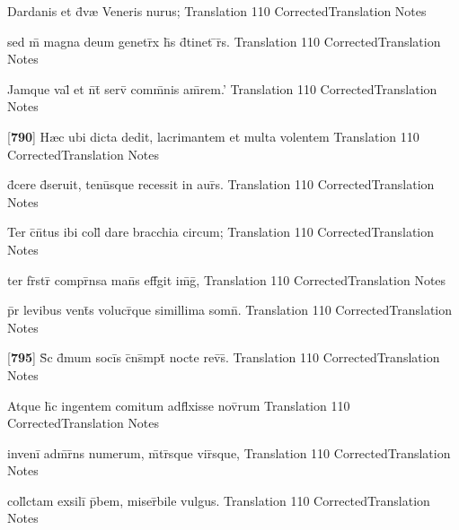 \latline
  {Dardanis et d\={\macron {\i}}v{\ae} Veneris nurus;}
  { Translation }
  {110}
  { CorrectedTranslation }
  { Notes }


\latline
  {sed m\={} magna deum genetr\={\macron {\i}}x h\={\macron {\i}}s d\={}tinet \={}r\={\macron {\i}}s.}
  { Translation }
  {110}
  { CorrectedTranslation }
  { Notes }


\latline
  {Jamque val\={} et n\={}t\={\macron {\i}} serv\={} comm\={}nis am\={}rem.'}
  { Translation }
  {110}
  { CorrectedTranslation }
  { Notes }


\latline
  {[\textbf{790}] H{\ae}c ubi dicta dedit, lacrimantem et multa volentem}
  { Translation }
  {110}
  { CorrectedTranslation }
  { Notes }


\latline
  {d\={\macron {\i}}cere d\={}seruit, tenu\={\macron {\i}}sque recessit in aur\={}s.}
  { Translation }
  {110}
  { CorrectedTranslation }
  { Notes }


\latline
  {Ter c\={}n\={}tus ibi coll\={} dare bracchia circum;}
  { Translation }
  {110}
  { CorrectedTranslation }
  { Notes }


\latline
  {ter fr\={}str\={} compr\={}nsa man\={}s eff\={}git im\={}g\={},}
  { Translation }
  {110}
  { CorrectedTranslation }
  { Notes }


\latline
  {p\={}r levibus vent\={\macron {\i}}s volucr\={\macron {\i}}que simillima somn\={}.}
  { Translation }
  {110}
  { CorrectedTranslation }
  { Notes }


\latline
  {[\textbf{795}] S\={\macron {\i}}c d\={}mum soci\={}s c\={}ns\={}mpt\={} nocte rev\={\macron {\i}}s\={}.}
  { Translation }
  {110}
  { CorrectedTranslation }
  { Notes }


\latline
  {Atque h\={\macron {\i}}c ingentem comitum adfl\={}xisse nov\={}rum}
  { Translation }
  {110}
  { CorrectedTranslation }
  { Notes }


\latline
  {inveni\={} adm\={\macron {\i}}r\={}ns numerum, m\={}tr\={}sque vir\={}sque,}
  { Translation }
  {110}
  { CorrectedTranslation }
  { Notes }


\latline
  {coll\={}ctam exsili\={} p\={}bem, miser\={}bile vulgus.}
  { Translation }
  {110}
  { CorrectedTranslation }
  { Notes }


